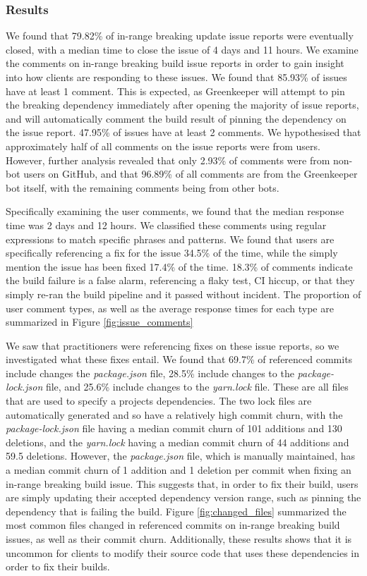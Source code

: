 \subsubsection{Results}
We found that 79.82\% of in-range breaking update issue reports were eventually closed, with a median time to close the issue of 4 days and 11 hours. We examine the comments on in-range breaking build issue reports in order to gain insight into how clients are responding to these issues. We found that 85.93\% of issues have at least 1 comment. This is expected, as Greenkeeper will attempt to pin the breaking dependency immediately after opening the majority of issue reports, and will automatically comment the build result of pinning the dependency on the issue report. 47.95\% of issues have at least 2 comments. We hypothesised that approximately half of all comments on the issue reports were from users. However, further analysis revealed that only 2.93\% of comments were from non-bot users on GitHub, and that 96.89\% of all comments are from the Greenkeeper bot itself, with the remaining comments being from other bots.
\par
Specifically examining the user comments, we found that the median response time was 2 days and 12 hours. We classified these comments using regular expressions to match specific phrases and patterns. We found that users are specifically referencing a fix for the issue 34.5\% of the time, while the simply mention the issue has been fixed 17.4\% of the time. 18.3\% of comments indicate the build failure is a false alarm, referencing a flaky test, CI hiccup, or that they simply re-ran the build pipeline and it passed without incident. The proportion of user comment types, as well as the average response times for each type are summarized in Figure \ref{fig:issue_comments}

\par
We saw that practitioners were referencing fixes on these issue reports, so we investigated what these fixes entail. We found that 69.7\% of referenced commits include changes the \textit{package.json} file, 28.5\% include changes to the \textit{package-lock.json} file, and 25.6\% include changes to the \textit{yarn.lock} file. These are all files that are used to specify a projects dependencies. The two lock files are automatically generated and so have a relatively high commit churn, with the \textit{package-lock.json} file having a median commit churn of 101 additions and 130 deletions, and the \textit{yarn.lock} having a median commit churn of 44 additions and 59.5 deletions. However, the \textit{package.json} file, which is manually maintained, has a median commit churn of 1 addition and 1 deletion per commit when fixing an in-range breaking build issue. This suggests that, in order to fix their build, users are simply updating their accepted dependency version range, such as pinning the dependency that is failing the build. Figure \ref{fig:changed_files} summarized the most common files changed in referenced commits on in-range breaking build issues, as well as their commit churn. Additionally, these results shows that it is uncommon for clients to modify their source code that uses these dependencies in order to fix their builds.

